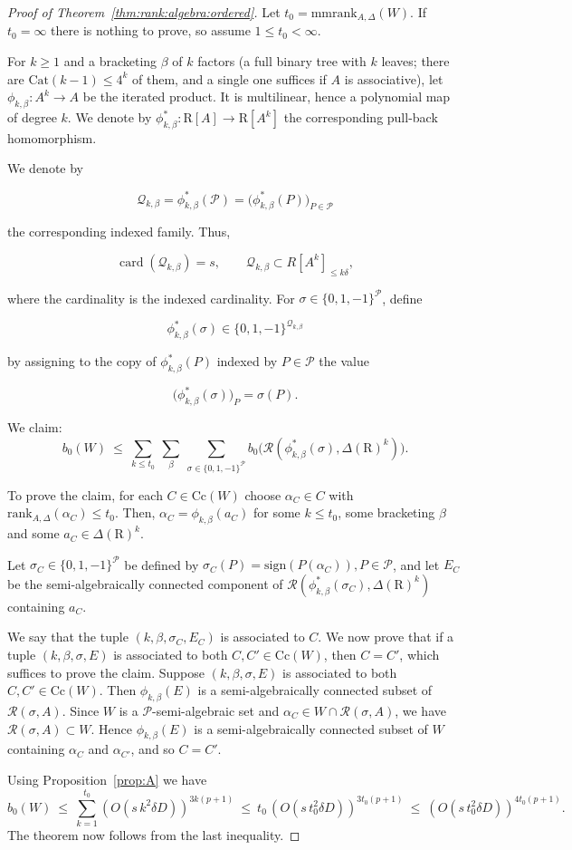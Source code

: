 \documentclass[10pt]{amsart}
\theoremstyle{definition}
\theoremstyle{remark}
\numberwithin{equation}{section}
\newcommand {\sign} {\mathrm{sign}}
\newcommand {\R} {\mathrm{R}}
\newcommand {\RR} {{\mathcal R}}
\newcommand{\rank}{\mathrm{rank}}
\newcommand{\Cc}{\mathrm{Cc}}
\newcommand{\mmrank}{\mathrm{mmrank}}
\begin{document}
\begin{proof}[Proof of Theorem~\ref{thm:rank:algebra:ordered}]
Let $t_0=\mmrank_{A,\Delta}(W)$. If $t_0=\infty$ there is nothing to prove, so assume $1\le t_0<\infty$.

For $k\geq 1$ and a bracketing $\beta$ of $k$ factors (a full binary tree with $k$ leaves; there are $\mathrm{Cat}(k-1)\le 4^k$ of them, and a single one suffices if $A$ is associative), let $\phi_{k,\beta}:A^k\to A$ be the iterated product. It is multilinear, hence a polynomial map of degree $k$. 
We denote by $\phi_{k,\beta}^*: \R[A] \rightarrow \R[A^k]$ the corresponding pull-back homomorphism. 

We denote by

$$
\mathcal Q_{k,\beta}
=
\phi_{k,\beta}^*(\mathcal P)
=
\bigl(\phi_{k,\beta}^*(P)\bigr)_{P\in\mathcal P}
$$

the corresponding indexed family. Thus,

$$
\operatorname{card}(\mathcal Q_{k,\beta})=s,
\qquad
\mathcal Q_{k,\beta}\subset R[A^k]_{\le k\delta},
$$

where the cardinality is the indexed cardinality. For
\(\sigma\in\{0,1,-1\}^{\mathcal P}\), define

$$
\phi_{k,\beta}^*(\sigma)
   \in\{0,1,-1\}^{\mathcal Q_{k,\beta}}
$$

by assigning to the copy of \(\phi_{k,\beta}^*(P)\) indexed by
\(P\in\mathcal P\) the value

$$
\bigl(\phi_{k,\beta}^*(\sigma)\bigr)_P=\sigma(P).
$$


We claim:
\[
b_0(W)\ \le\ \sum_{k\le t_0}\ \sum_{\beta}\ \sum_{\sigma\in\{0,1, -1\}^{\mathcal{P}}} b_0
\bigl(\RR(\phi_{k,\beta}^*(\sigma),\Delta(\R)^k)\bigr).
\]


To prove the claim,
for each $C\in\Cc(W)$ choose $\alpha_C\in C$ with $\rank_{A,\Delta}(\alpha_C)\leq t_0$. Then, $\alpha_C=\phi_{k,\beta}(a_C)$ for some $k\leq t_0$, some bracketing $\beta$ and some $a_C\in\Delta(\R)^k$. 

Let $\sigma_C\in\{0,1,-1\}^{\mathcal{P}}$ be 
defined by $\sigma_C(P) = \sign(P(\alpha_C)), P \in \mathcal{P}$,
and let $E_C$ be the semi-algebraically connected component of 
$\RR(\phi_{k,\beta}^*(\sigma_C), \Delta(\R)^k)$ 
containing $a_C$. 

We say that the tuple $(k,\beta,\sigma_C,E_C)$ is associated to $C$.
We now prove that if a tuple $(k,\beta,\sigma,E)$ is associated to both $C,C' \in \Cc(W)$, then $C = C'$, which suffices to prove the claim. Suppose 
$(k,\beta,\sigma,E)$ is associated to both $C,C' \in \Cc(W)$.
 Then $\phi_{k,\beta}(E)$ is a semi-algebraically connected subset of $\RR(\sigma,A)$. Since $W$ is a $\mathcal{P}$-semi-algebraic set and $\alpha_C\in W\cap\RR(\sigma,A)$, we have $\RR(\sigma,A)\subset W$. Hence $\phi_{k,\beta}(E)$ is a semi-algebraically connected subset of $W$ containing $\alpha_C$ and $\alpha_{C'}$, and so $C=C'$.

Using Proposition~\ref{prop:A} we have
\[
b_0(W)\ \le\ \sum_{k=1}^{t_0}\left(O(s\,k^2\delta D)\right)^{3k(p+1)}
\ \leq\ t_0\,\left(O(s\,t_0^2\delta D)\right)^{3t_0(p+1)}
\ \le\ \left(O(s\,t_0^2\delta D)\right)^{4t_0(p+1)}.
\]
The theorem now follows from the last inequality. 
\end{proof}
\end{document}
